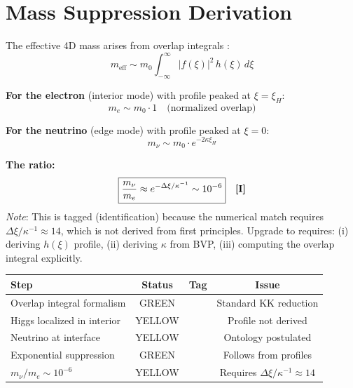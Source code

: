 \section{Mass Suppression Derivation}
\label{sec:mass_suppression}

The effective 4D mass arises from overlap integrals \tagBL{}:
\begin{equation}
    m_{\text{eff}} \sim m_0 \int_{-\infty}^{\infty} |f(\xi)|^2 \, h(\xi) \, d\xi
\end{equation}

\textbf{For the electron} (interior mode) with profile peaked at $\xi = \xi_H$:
\begin{equation}
    m_e \sim m_0 \cdot 1 \quad \text{(normalized overlap)}
\end{equation}

\textbf{For the neutrino} (edge mode) with profile peaked at $\xi = 0$:
\begin{equation}
    m_\nu \sim m_0 \cdot e^{-2\kappa \xi_H}
\end{equation}

\textbf{The ratio:}
\begin{equation}
    \boxed{\frac{m_\nu}{m_e} \approx e^{-\Delta\xi/\kappa^{-1}} \sim 10^{-6}}
    \quad \textbf{[I]}{}
\end{equation}
\textit{Note}: This is tagged \tagI{} (identification) because the numerical match
requires $\Delta\xi/\kappa^{-1} \approx 14$, which is not derived from first principles.
Upgrade to \tagDcApprox{} requires: (i) deriving $h(\xi)$ profile, (ii) deriving
$\kappa$ from BVP, (iii) computing the overlap integral explicitly.

\begin{center}
\begin{tabular}{lccc}
\toprule
\textbf{Step} & \textbf{Status} & \textbf{Tag} & \textbf{Issue} \\
\midrule
Overlap integral formalism & GREEN & \tagBL{} & Standard KK reduction \\
Higgs localized in interior & YELLOW & \tagP{} & Profile not derived \\
Neutrino at interface & YELLOW & \tagP{} & Ontology postulated \\
Exponential suppression & GREEN & \tagDc{} & Follows from profiles \\
$m_\nu/m_e \sim 10^{-6}$ & YELLOW & \tagI{} & Requires $\Delta\xi/\kappa^{-1} \approx 14$ \\
\bottomrule
\end{tabular}
\end{center}


